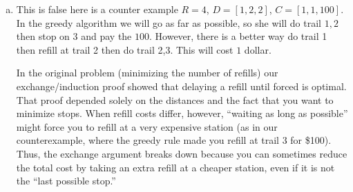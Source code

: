 \documentclass[12pt, letterpaper]{article}
\theoremstyle{definition}
\newcounter{problem}
\begin{document}
\begin{enumerate}[(a)]
    \item This is false here is a counter example $R=4$, $D=[1,2,2]$, $C=[1,1,100]$. In the greedy algorithm we will go as far as possible, so she will do trail $1,2$ then stop on 3 and pay the $100$. However, there is a better way do trail 1 then refill at trail 2 then do trail 2,3. This will cost $1$ dollar.
    
    In the original problem (minimizing the number of refills) our exchange/induction proof showed that delaying a refill until forced is optimal. That proof depended solely on the distances and the fact that you want to minimize stops. When refill costs differ, however, “waiting as long as possible” might force you to refill at a very expensive station (as in our counterexample, where the greedy rule made you refill at trail 3 for \$100). Thus, the exchange argument breaks down because you can sometimes reduce the total cost by taking an extra refill at a cheaper station, even if it is not the “last possible stop.”
\end{enumerate}
\end{document}
